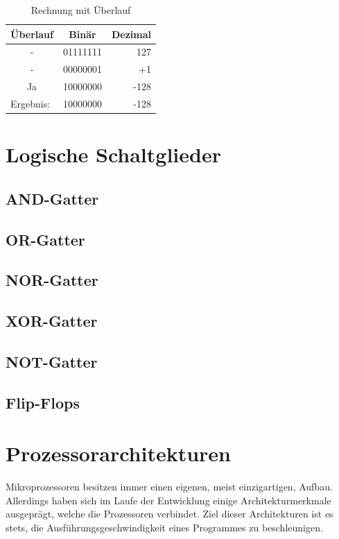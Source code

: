 \documentclass[12pt]{article}
\begin{document}
\begin{table}[!htb]
\centering
\caption{Rechnung mit Überlauf}
\label{my-label}
\begin{tabular}{|c|r|r|}
\hline
\textbf{Überlauf}               & \multicolumn{1}{c|}{\textbf{Binär}} & \multicolumn{1}{c|}{\textbf{Dezimal}} \\ \hline
-                               & 01111111                            & 127                                   \\ \hline
-                               & 00000001                            & +1                                    \\ \hline
Ja                              & 10000000                            & -128                                  \\ \hline\hline
\multicolumn{1}{|l|}{Ergebnis:} & 10000000                            & -128                                  \\ \hline
\end{tabular}
\end{table}



\section{Logische Schaltglieder}
\subsection{AND-Gatter}
\subsection{OR-Gatter}
\subsection{NOR-Gatter}
\subsection{XOR-Gatter}
\subsection{NOT-Gatter}
\subsection{Flip-Flops}

\section{Prozessorarchitekturen}
Mikroprozessoren besitzen immer einen eigenen, meist einzigartigen, Aufbau. Allerdings haben sich im Laufe der Entwicklung einige Architekturmerkmale ausgeprägt, welche die Prozessoren verbindet. 
Ziel dieser Architekturen ist es stets, die Ausführungsgeschwindigkeit eines Programmes zu beschleunigen.
\end{document}

